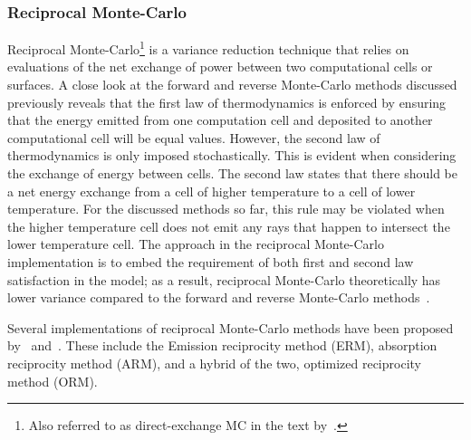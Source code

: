 
\subsubsection{Reciprocal Monte-Carlo}
Reciprocal Monte-Carlo\footnote{Also referred to as direct-exchange MC in the text by~\citet{Modest2022ChapterMediac}.} is a variance reduction technique that relies on evaluations of the net exchange of power between two computational cells or surfaces.
A close look at the forward and reverse Monte-Carlo methods discussed previously reveals that the first law of thermodynamics is enforced by ensuring that the energy emitted from one computation cell and deposited to another computational cell will be equal values. However, the second law of thermodynamics is only imposed stochastically. This is evident when considering the exchange of energy between cells. The second law states that there should be a net energy exchange from a cell of higher temperature to a cell of lower temperature. For the discussed methods so far, this rule may be violated when the higher temperature cell does not emit any rays that happen to intersect the lower temperature cell.
The approach in the reciprocal Monte-Carlo implementation is to embed the requirement of both first and second law satisfaction in the model; as a result, reciprocal Monte-Carlo theoretically has lower variance compared to the forward and reverse Monte-Carlo methods~\cite{Howell2020ThermalTransfer}. 

Several implementations of reciprocal Monte-Carlo methods have been proposed by~\citet{Tesse2002RadiativeApproach} and~\citet{Dupoirieux2006AnThicknesses}. These include the Emission reciprocity method (ERM), absorption reciprocity method (ARM), and a hybrid of the two, optimized reciprocity method (ORM).

